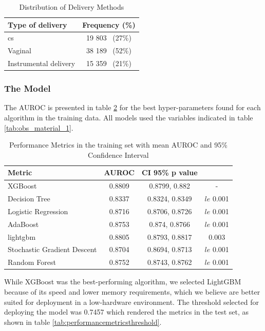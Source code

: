 \begin{table}[htbp]
  \centering
  \caption{Distribution of Delivery Methods}
  \label{tab:delivery_methods}
  \renewcommand{\arraystretch}{1.5} %
  \setlength{\tabcolsep}{12pt} %
  \begin{tabular}{lc}
    \hline
    \textbf{Type of delivery} & \textbf{Frequency (\%)} \\
\hline
    \ac{cs} & 19 803 \, (27\%) \\

    Vaginal & 38 189 \, (52\%) \\

    Instrumental delivery & 15 359 \, (21\%) \\
    \hline
  \end{tabular}
\end{table}



\subsubsection{The Model}
The AUROC is presented in table \ref{tab:performancemetricsauc} for the best hyper-parameters found for each algorithm in the training data. All models used the variables indicated in table \ref{tab:obs_material_1}.
\begin{table}[htbp]
  \centering
  \caption[Performance Metrics in the training set]{Performance Metrics in the training set with mean AUROC and 95\% Confidence Interval}
  \label{tab:performancemetricsauc}
  \renewcommand{\arraystretch}{1.5} %
  \setlength{\tabcolsep}{12pt} %
  \begin{tabular}{lccc}
    \hline
    \textbf{Metric} & \textbf{AUROC} & \textbf{CI 95\%} \textbf{p value} \\
    \hline
    XGBoost & 0.8809 & 0.8799, 0.882 & - \\  
    Decision Tree & 0.8337 & 0.8324, 0.8349 & $le$ 0.001\\
    Logistic Regression & 0.8716 & 0.8706, 0.8726 & $le$ 0.001\\
    AdaBoost & 0.8753 & 0.874, 0.8766 & $le$ 0.001\\ 
    lightgbm & 0.8805 & 0.8793, 0.8817 &  0.003\\ 
    Stochastic Gradient Descent & 0.8704 & 0.8694, 0.8713& $le$ 0.001\\ 
    Random Forest & 0.8752 & 0.8743, 0.8762& $le$ 0.001 \\  
    \hline
  \end{tabular}
\end{table}
While XGBoost was the best-performing algorithm, we selected LightGBM  \cite{lightgbm} because of its speed and lower memory requirements, which we believe are better suited for deployment in a low-hardware environment. The threshold selected for deploying the model was 0.7457 which rendered the metrics in the test set, as shown in table \ref{tab:performancemetricsthreshold}.

